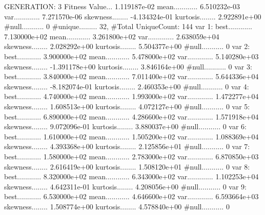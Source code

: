 \documentclass[oneside,letterpaper,titlepage]{article}
\begin{document}
\begin{Schunk}
\begin{Soutput}
GENERATION: 3
Fitness Value... 1.119187e-02
mean............ 6.510232e-03
var............. 7.271570e-06
skewness........ -4.134324e-01
kurtosis........ 2.922891e+00
#null........... 0
#unique......... 32, #Total UniqueCount: 144
var 1:
best............ 7.130000e+02
mean............ 3.261800e+02
var............. 2.638059e+04
skewness........ 2.028292e+00
kurtosis........ 5.504377e+00
#null........... 0
var 2:
best............ 3.900000e+02
mean............ 5.478000e+02
var............. 5.140280e+03
skewness........ -1.391178e+00
kurtosis........ 3.846164e+00
#null........... 0
var 3:
best............ 3.840000e+02
mean............ 7.011400e+02
var............. 5.644336e+04
skewness........ -8.182074e-01
kurtosis........ 2.460353e+00
#null........... 0
var 4:
best............ 4.740000e+02
mean............ 1.993000e+02
var............. 1.472277e+04
skewness........ 1.608513e+00
kurtosis........ 4.072127e+00
#null........... 0
var 5:
best............ 6.890000e+02
mean............ 4.286600e+02
var............. 1.571918e+04
skewness........ 9.072096e-01
kurtosis........ 3.880037e+00
#null........... 0
var 6:
best............ 1.610000e+02
mean............ 1.505200e+02
var............. 1.088369e+04
skewness........ 4.393368e+00
kurtosis........ 2.125856e+01
#null........... 0
var 7:
best............ 1.580000e+02
mean............ 2.783000e+02
var............. 6.870850e+03
skewness........ 2.616419e+00
kurtosis........ 1.508120e+01
#null........... 0
var 8:
best............ 8.320000e+02
mean............ 6.343000e+02
var............. 1.102253e+04
skewness........ 4.642311e-01
kurtosis........ 4.208056e+00
#null........... 0
var 9:
best............ 6.530000e+02
mean............ 4.646600e+02
var............. 6.593664e+03
skewness........ 1.508774e+00
kurtosis........ 4.578840e+00
#null........... 0


\end{Soutput}
\end{Schunk}
\end{document}
